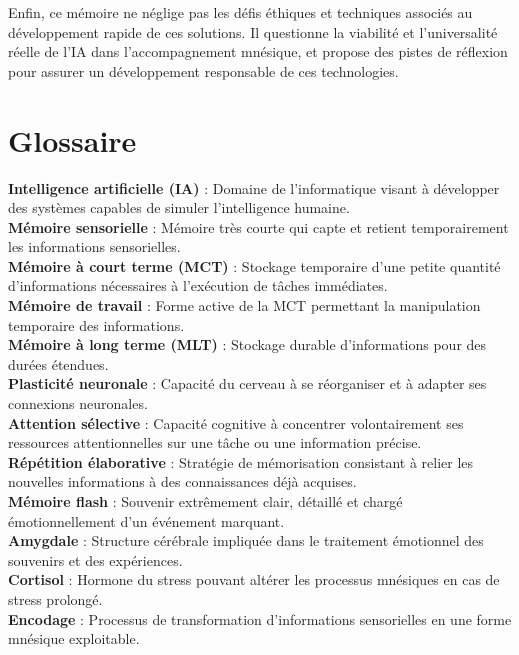 \documentclass[11pt,a4paper]{report}
\begin{document}
Enfin, ce mémoire ne néglige pas les défis éthiques et techniques associés au développement rapide de ces solutions. Il questionne la viabilité et l’universalité réelle de l’IA dans l’accompagnement mnésique, et propose des pistes de réflexion pour assurer un développement responsable de ces technologies.

\tableofcontents

\listoffigures

\chapter*{Glossaire}

\textbf{Intelligence artificielle (IA)} : Domaine de l'informatique visant à développer des systèmes capables de simuler l'intelligence humaine.\\
\textbf{Mémoire sensorielle} : Mémoire très courte qui capte et retient temporairement les informations sensorielles.\\
\textbf{Mémoire à court terme (MCT)} : Stockage temporaire d'une petite quantité d'informations nécessaires à l'exécution de tâches immédiates.\\
\textbf{Mémoire de travail} : Forme active de la MCT permettant la manipulation temporaire des informations.\\
\textbf{Mémoire à long terme (MLT)} : Stockage durable d'informations pour des durées étendues.\\
\textbf{Plasticité neuronale} : Capacité du cerveau à se réorganiser et à adapter ses connexions neuronales.\\
\textbf{Attention sélective} : Capacité cognitive à concentrer volontairement ses ressources attentionnelles sur une tâche ou une information précise.\\
\textbf{Répétition élaborative} : Stratégie de mémorisation consistant à relier les nouvelles informations à des connaissances déjà acquises.\\
\textbf{Mémoire flash} : Souvenir extrêmement clair, détaillé et chargé émotionnellement d’un événement marquant.\\
\textbf{Amygdale} : Structure cérébrale impliquée dans le traitement émotionnel des souvenirs et des expériences.\\
\textbf{Cortisol} : Hormone du stress pouvant altérer les processus mnésiques en cas de stress prolongé.\\
\textbf{Encodage} : Processus de transformation d'informations sensorielles en une forme mnésique exploitable.\\
\end{document}
